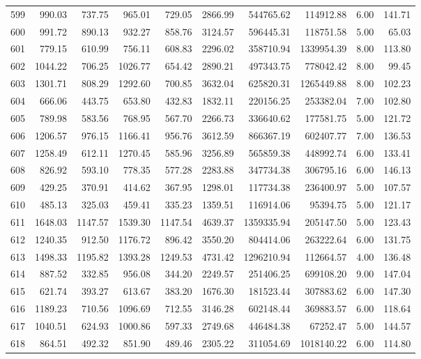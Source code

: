\begin{tabular}{lrrrrrrrrr}
599 & 990.03 & 737.75 & 965.01 & 729.05 & 2866.99 & 544765.62 & 114912.88 & 6.00 & 141.71 \\
600 & 991.72 & 890.13 & 932.27 & 858.76 & 3124.57 & 596445.31 & 118751.58 & 5.00 & 65.03 \\
601 & 779.15 & 610.99 & 756.11 & 608.83 & 2296.02 & 358710.94 & 1339954.39 & 8.00 & 113.80 \\
602 & 1044.22 & 706.25 & 1026.77 & 654.42 & 2890.21 & 497343.75 & 778042.42 & 8.00 & 99.45 \\
603 & 1301.71 & 808.29 & 1292.60 & 700.85 & 3632.04 & 625820.31 & 1265449.88 & 8.00 & 102.23 \\
604 & 666.06 & 443.75 & 653.80 & 432.83 & 1832.11 & 220156.25 & 253382.04 & 7.00 & 102.80 \\
605 & 789.98 & 583.56 & 768.95 & 567.70 & 2266.73 & 336640.62 & 177581.75 & 5.00 & 121.72 \\
606 & 1206.57 & 976.15 & 1166.41 & 956.76 & 3612.59 & 866367.19 & 602407.77 & 7.00 & 136.53 \\
607 & 1258.49 & 612.11 & 1270.45 & 585.96 & 3256.89 & 565859.38 & 448992.74 & 6.00 & 133.41 \\
608 & 826.92 & 593.10 & 778.35 & 577.28 & 2283.88 & 347734.38 & 306795.16 & 6.00 & 146.13 \\
609 & 429.25 & 370.91 & 414.62 & 367.95 & 1298.01 & 117734.38 & 236400.97 & 5.00 & 107.57 \\
610 & 485.13 & 325.03 & 459.41 & 335.23 & 1359.51 & 116914.06 & 95394.75 & 5.00 & 121.17 \\
611 & 1648.03 & 1147.57 & 1539.30 & 1147.54 & 4639.37 & 1359335.94 & 205147.50 & 5.00 & 123.43 \\
612 & 1240.35 & 912.50 & 1176.72 & 896.42 & 3550.20 & 804414.06 & 263222.64 & 6.00 & 131.75 \\
613 & 1498.33 & 1195.82 & 1393.28 & 1249.53 & 4731.42 & 1296210.94 & 112664.57 & 4.00 & 136.48 \\
614 & 887.52 & 332.85 & 956.08 & 344.20 & 2249.57 & 251406.25 & 699108.20 & 9.00 & 147.04 \\
615 & 621.74 & 393.27 & 613.67 & 383.20 & 1676.30 & 181523.44 & 307883.62 & 6.00 & 147.30 \\
616 & 1189.23 & 710.56 & 1096.69 & 712.55 & 3146.28 & 602148.44 & 369883.57 & 6.00 & 118.64 \\
617 & 1040.51 & 624.93 & 1000.86 & 597.33 & 2749.68 & 446484.38 & 67252.47 & 5.00 & 144.57 \\
618 & 864.51 & 492.32 & 851.90 & 489.46 & 2305.22 & 311054.69 & 1018140.22 & 6.00 & 114.80 \\

\end{tabular}
